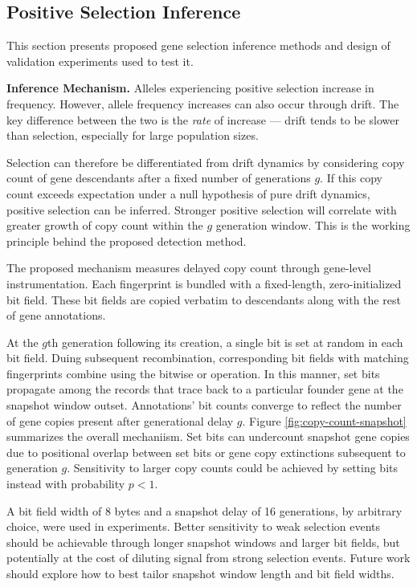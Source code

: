 \subsection{Positive Selection Inference}
\label{sec:selection-inference}

This section presents proposed gene selection inference methods and design of validation experiments used to test it.


\textbf{Inference Mechanism.}
Alleles experiencing positive selection increase in frequency.
However, allele frequency increases can also occur through drift.
The key difference between the two is the \textit{rate} of increase --- drift tends to be slower than selection, especially for large population sizes.

Selection can therefore be differentiated from drift dynamics by considering copy count of gene descendants after a fixed number of generations $g$.
If this copy count exceeds expectation under a null hypothesis of pure drift dynamics, positive selection can be inferred.
Stronger positive selection will correlate with greater growth of copy count within the $g$ generation window.
This is the working principle behind the proposed detection method.

The proposed mechanism measures delayed copy count through gene-level instrumentation.
Each fingerprint is bundled with a fixed-length, zero-initialized bit field.
These bit fields are copied verbatim to descendants along with the rest of gene annotations.

At the $g$th generation following its creation, a single bit is set at random in each bit field.
Duing subsequent recombination, corresponding bit fields with matching fingerprints combine using the bitwise or operation.
In this manner, set bits propagate among the records that trace back to a particular founder gene at the snapshot window outset.
Annotations' bit counts converge to reflect the number of gene copies present after generational delay $g$.
Figure \ref{fig:copy-count-snapshot} summarizes the overall mechaniism.
Set bits can undercount snapshot gene copies due to positional overlap between set bits or gene copy extinctions subsequent to generation $g$.
Sensitivity to larger copy counts could be achieved by setting bits instead with probability $p < 1$.

A bit field width of 8 bytes and a snapshot delay of 16 generations, by arbitrary choice, were used in experiments.
Better sensitivity to weak selection events should be achievable through longer snapshot windows and larger bit fields, but potentially at the cost of diluting signal from strong selection events.
Future work should explore how to best tailor snapshot window length and bit field widths.


